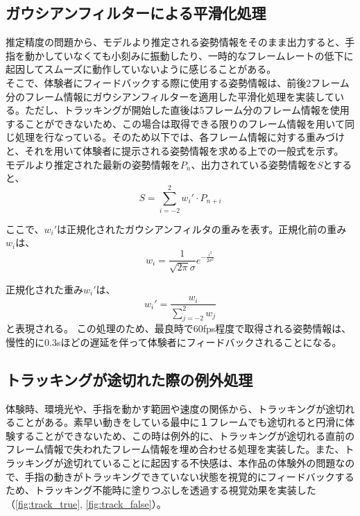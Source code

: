 \subsection{ガウシアンフィルターによる平滑化処理}
推定精度の問題から、モデルより推定される姿勢情報をそのまま出力すると、手指を動かしていなくても小刻みに振動したり、一時的なフレームレートの低下に起因してスムーズに動作していないように感じることがある。\\
そこで、体験者にフィードバックする際に使用する姿勢情報は、前後2フレーム分のフレーム情報にガウシアンフィルターを適用した平滑化処理を実装している。ただし、トラッキングが開始した直後は5フレーム分のフレーム情報を使用することができないため、この場合は取得できる限りのフレーム情報を用いて同じ処理を行なっている。そのため以下では、各フレーム情報に対する重みづけと、それを用いて体験者に提示される姿勢情報を求める上での一般式を示す。
モデルより推定された最新の姿勢情報を\(P_{n}\)、出力されている姿勢情報を\(S\)とすると、
  \begin{equation}
    S = \sum_{i=-2}^{2} w_i' \cdot P_{n+i}
    \end{equation}

ここで、\(w_i'\)は正規化されたガウシアンフィルタの重みを表す。正規化前の重み\(w_i\)は、
\begin{equation}
  w_i = \frac{1}{\sqrt{2\pi}\sigma} e^{-\frac{i^2}{2\sigma^2}}
  \end{equation}

正規化された重み\(w_i'\)は、
  \begin{equation}
  w_i' = \frac{w_i}{\sum_{j=-2}^{2} w_j}
  \end{equation}
と表現される。
この処理のため、最良時で60fps程度で取得される姿勢情報は、慢性的に0.3sほどの遅延を伴って体験者にフィードバックされることになる。

\subsection{トラッキングが途切れた際の例外処理}
体験時、環境光や、手指を動かす範囲や速度の関係から、トラッキングが途切れることがある。素早い動きをしている最中に１フレームでも途切れると円滑に体験することができないため、この時は例外的に、トラッキングが途切れる直前のフレーム情報で失われたフレーム情報を埋め合わせる処理を実装した。また、トラッキングが途切れていることに起因する不快感は、本作品の体験外の問題なので、手指の動きがトラッキングできていない状態を視覚的にフィードバックするため、トラッキング不能時に塗りつぶしを透過する視覚効果を実装した（\ref{fig:track_true}, \ref{fig:track_false}）。

